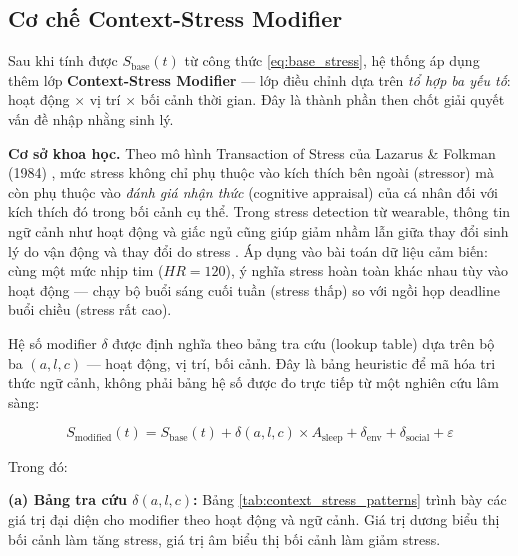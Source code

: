 \subsection{Cơ chế Context-Stress Modifier}
\label{subsec:context_stress_modifier}

Sau khi tính được $S_{\text{base}}(t)$ từ công thức \eqref{eq:base_stress}, hệ thống áp dụng thêm lớp \textbf{Context-Stress Modifier} — lớp điều chỉnh dựa trên \textit{tổ hợp ba yếu tố}: hoạt động $\times$ vị trí $\times$ bối cảnh thời gian. Đây là thành phần then chốt giải quyết vấn đề nhập nhằng sinh lý.

\textbf{Cơ sở khoa học.} Theo mô hình Transaction of Stress của Lazarus \& Folkman (1984) \cite{lazarus1984stress}, mức stress không chỉ phụ thuộc vào kích thích bên ngoài (stressor) mà còn phụ thuộc vào \textit{đánh giá nhận thức} (cognitive appraisal) của cá nhân đối với kích thích đó trong bối cảnh cụ thể. Trong stress detection từ wearable, thông tin ngữ cảnh như hoạt động và giấc ngủ cũng giúp giảm nhầm lẫn giữa thay đổi sinh lý do vận động và thay đổi do stress \cite{stojchevska2022context}. Áp dụng vào bài toán dữ liệu cảm biến: cùng một mức nhịp tim ($HR = 120$), ý nghĩa stress hoàn toàn khác nhau tùy vào hoạt động — chạy bộ buổi sáng cuối tuần (stress thấp) so với ngồi họp deadline buổi chiều (stress rất cao).

Hệ số modifier $\delta$ được định nghĩa theo bảng tra cứu (lookup table) dựa trên bộ ba $(a, l, c)$ — hoạt động, vị trí, bối cảnh. Đây là bảng heuristic để mã hóa tri thức ngữ cảnh, không phải bảng hệ số được đo trực tiếp từ một nghiên cứu lâm sàng:

\begin{equation}
\label{eq:context_modifier}
    S_{\text{modified}}(t) = S_{\text{base}}(t) + \delta(a, l, c) \times A_{\text{sleep}} + \delta_{\text{env}} + \delta_{\text{social}} + \varepsilon
\end{equation}

Trong đó:

\textbf{(a) Bảng tra cứu $\delta(a, l, c)$:} Bảng \ref{tab:context_stress_patterns} trình bày các giá trị đại diện cho modifier theo hoạt động và ngữ cảnh. Giá trị dương biểu thị bối cảnh làm tăng stress, giá trị âm biểu thị bối cảnh làm giảm stress.

